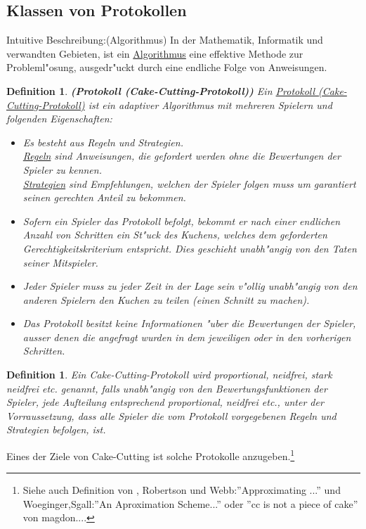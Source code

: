 \documentclass[11pt, a4paper, twoside]{article}
\newtheorem{defi}[satz]{Definition}
\numberwithin{equation}{section}
\begin{document}
\subsection{Klassen von Protokollen}
Intuitive Beschreibung:(Algorithmus)
\newline In der Mathematik, Informatik und verwandten Gebieten, ist ein \underline{Algorithmus} eine effektive Methode zur Probleml"osung, ausgedr"uckt durch eine endliche Folge von Anweisungen.
\begin{defi}{\textbf{(Protokoll (Cake-Cutting-Protokoll))}}
\newline Ein \underline{Protokoll (Cake-Cutting-Protokoll)} ist ein adaptiver Algorithmus mit mehreren Spielern und folgenden Eigenschaften:
\begin{itemize}
\item{Es besteht aus Regeln und Strategien.\\ \underline{Regeln} sind Anweisungen, die gefordert werden ohne die Bewertungen der Spieler zu kennen.\\ \underline{Strategien} sind Empfehlungen, welchen der Spieler folgen muss um garantiert seinen gerechten Anteil zu bekommen.
} 
\item{Sofern ein Spieler das Protokoll befolgt, bekommt er nach einer endlichen Anzahl von Schritten ein St"uck des Kuchens, welches dem geforderten Gerechtigkeitskriterium entspricht. Dies geschieht unabh"angig von den Taten seiner Mitspieler.}
\item Jeder Spieler muss zu jeder Zeit in der Lage sein v"ollig unabh"angig von den anderen Spielern den Kuchen zu teilen (einen Schnitt zu machen).
\item Das Protokoll besitzt keine Informationen "uber die Bewertungen der Spieler, ausser denen die angefragt wurden in dem jeweiligen oder in den vorherigen Schritten. 
\end{itemize}
\end{defi}
\begin{defi}
Ein Cake-Cutting-Protokoll wird proportional, neidfrei, stark neidfrei etc. genannt, falls unabh"angig von den Bewertungsfunktionen der Spieler, jede Aufteilung entsprechend proportional, neidfrei etc., unter der Vorraussetzung, dass alle Spieler die vom Protokoll vorgegebenen Regeln und Strategien befolgen, ist.
\end{defi}
Eines der Ziele von Cake-Cutting ist solche Protokolle anzugeben.\footnote{Siehe auch Definition von \cite{3}, Robertson und Webb:''Approximating ...'' und Woeginger,Sgall:''An Aproximation Scheme...'' oder ''cc is not a piece of cake'' von magdon....}
\end{document}
